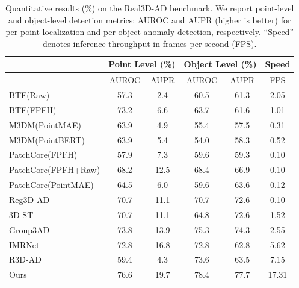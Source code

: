 \begin{table}[ht]
\centering
\caption{Quantitative results (\%) on the Real3D-AD benchmark. We report point-level and object-level detection metrics: AUROC and AUPR (higher is better) for per-point localization and per-object anomaly detection, respectively. ``Speed'' denotes inference throughput in frames-per-second (FPS).}
\label{tab:Real3D}
\begin{tabular}{l|cc|cc|c}
\hline
& \multicolumn{2}{c|}{Point Level (\%)} & \multicolumn{2}{c|}{Object Level (\%)} & Speed \\
\hline
& AUROC & AUPR & AUROC & AUPR & FPS \\ 
\hline
BTF(Raw)                            & 57.3 & 2.4 & 60.5 & 61.3  & 2.05 \\
BTF(FPFH)                           & 73.2 & 6.6 & 63.7 & 61.6  & 1.01 \\
M3DM(PointMAE)                      & 63.9 & 4.9 & 55.4 & 57.5  & 0.31 \\
M3DM(PointBERT)                     & 63.9 & 5.4 & 54.0 & 58.3  & 0.52 \\
PatchCore(FPFH)                     & 57.9 & 7.3 & 59.6 & 59.3  & 0.10 \\
PatchCore(FPFH+Raw)                 & 68.2 & 12.5 & 68.4 & 66.9  & 0.10 \\
PatchCore(PointMAE)                 & 64.5 & 6.0 & 59.6 & 63.6  & 0.12 \\
Reg3D-AD \cite{liu2023real3d}       & 70.7 & 11.1 & 70.7 & 72.6  & 0.10 \\
3D-ST \cite{bergmann2023anomaly}    & 70.7 & 11.1 & 64.8 & 72.6  & 1.52 \\
Group3AD   \cite{zhu2024towards}    & 73.8 & 13.9 & 75.3 & 74.3  & 2.55 \\
IMRNet   \cite{li2024towards}       & 72.8 & 16.8 & 72.8 & 62.8  & 5.62 \\
R3D-AD   \cite{zhou2024r3d}         & 59.4 & 4.3 & 73.6 & 63.5  & 7.15 \\
Ours                                & 76.6 & 19.7 & 78.4 & 77.7 & 17.31 \\
\hline
\end{tabular}
\end{table}


